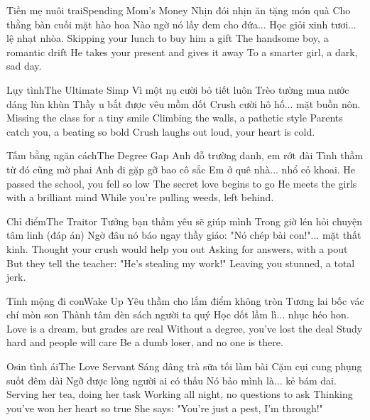 \begin{tutuyetbox}{Tiền mẹ nuôi trai}{Spending Mom's Money}
Nhịn đói nhịn ăn tặng món quà
Cho thằng bàn cuối mặt hào hoa
Nào ngờ nó lấy đem cho đứa...
Học giỏi xinh tươi... lệ nhạt nhòa.
\tcblower
Skipping your lunch to buy him a gift 
The handsome boy, a romantic drift 
He takes your present and gives it away 
To a smarter girl, a dark, sad day.
\end{tutuyetbox}

\begin{tutuyetbox}{Lụy tình}{The Ultimate Simp}
Vì một nụ cười bỏ tiết luôn
Trèo tường mua nước dáng lùn khùn
Thầy u bắt được vêu mồm dốt
Crush cười hô hố... mặt buồn nôn.
\tcblower
Missing the class for a tiny smile 
Climbing the walls, a pathetic style 
Parents catch you, a beating so bold 
Crush laughs out loud, your heart is cold.
\end{tutuyetbox}

\begin{tutuyetbox}{Tấm bằng ngăn cách}{The Degree Gap}
Anh đỗ trường danh, em rớt đài
Tình thầm từ đó cũng mờ phai
Anh đi gặp gỡ bao cô sắc
Em ở quê nhà... nhổ cỏ khoai.
\tcblower
He passed the school, you fell so low 
The secret love begins to go 
He meets the girls with a brilliant mind 
While you're pulling weeds, left behind.
\end{tutuyetbox}

\begin{tutuyetbox}{Chỉ điểm}{The Traitor}
Tưởng bạn thầm yêu sẽ giúp mình
Trong giờ lén hỏi chuyện tâm linh (đáp án)
Ngờ đâu nó báo ngay thầy giáo:
"Nó chép bài con!"... mặt thất kinh.
\tcblower
Thought your crush would help you out 
Asking for answers, with a pout 
But they tell the teacher: "He's stealing my work!" 
Leaving you stunned, a total jerk.
\end{tutuyetbox}

\begin{tutuyetbox}{Tỉnh mộng đi con}{Wake Up}
Yêu thầm cho lắm điểm không tròn
Tương lai bốc vác chí mòn son
Thành tâm đèn sách người ta quý
Học dốt lầm lì... nhục héo hon.
\tcblower
Love is a dream, but grades are real 
Without a degree, you've lost the deal 
Study hard and people will care 
Be a dumb loser, and no one is there.
\end{tutuyetbox}
\begin{tutuyetbox}{Osin tình ái}{The Love Servant}
Sáng dâng trà sữa tối làm bài
Cặm cụi cung phụng suốt đêm dài
Ngỡ được lòng người ai có thấu
Nó bảo mình là... kẻ bám dai.
\tcblower
Serving her tea, doing her task
Working all night, no questions to ask
Thinking you've won her heart so true
She says: "You're just a pest, I'm through!"
\end{tutuyetbox}

